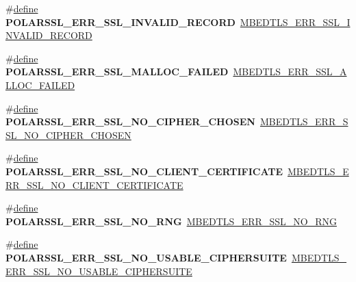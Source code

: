 \begin{DoxyCompactItemize}
\#\hyperlink{structdefine}{define} {\bfseries P\+O\+L\+A\+R\+S\+S\+L\+\_\+\+E\+R\+R\+\_\+\+S\+S\+L\+\_\+\+I\+N\+V\+A\+L\+I\+D\+\_\+\+R\+E\+C\+O\+RD}~\hyperlink{ssl_8h_aad21f6b8a740ef21dd162d91b809e3a4}{M\+B\+E\+D\+T\+L\+S\+\_\+\+E\+R\+R\+\_\+\+S\+S\+L\+\_\+\+I\+N\+V\+A\+L\+I\+D\+\_\+\+R\+E\+C\+O\+RD}
\item 
\mbox{\label{compat-1_83_8h_af35f4f9525fe3e98f989d2952fff254f}} 
\#\hyperlink{structdefine}{define} {\bfseries P\+O\+L\+A\+R\+S\+S\+L\+\_\+\+E\+R\+R\+\_\+\+S\+S\+L\+\_\+\+M\+A\+L\+L\+O\+C\+\_\+\+F\+A\+I\+L\+ED}~\hyperlink{ssl_8h_a701ee611f7a16a261b306466c8602177}{M\+B\+E\+D\+T\+L\+S\+\_\+\+E\+R\+R\+\_\+\+S\+S\+L\+\_\+\+A\+L\+L\+O\+C\+\_\+\+F\+A\+I\+L\+ED}
\item 
\mbox{\label{compat-1_83_8h_a95498cade77d8c7db264bf799b2753f5}} 
\#\hyperlink{structdefine}{define} {\bfseries P\+O\+L\+A\+R\+S\+S\+L\+\_\+\+E\+R\+R\+\_\+\+S\+S\+L\+\_\+\+N\+O\+\_\+\+C\+I\+P\+H\+E\+R\+\_\+\+C\+H\+O\+S\+EN}~\hyperlink{ssl_8h_a55ed67b6e414f9b381ff536d9ea6b9c0}{M\+B\+E\+D\+T\+L\+S\+\_\+\+E\+R\+R\+\_\+\+S\+S\+L\+\_\+\+N\+O\+\_\+\+C\+I\+P\+H\+E\+R\+\_\+\+C\+H\+O\+S\+EN}
\item 
\mbox{\label{compat-1_83_8h_aeb836450c3b6ffa966cf6cf74ffe927f}} 
\#\hyperlink{structdefine}{define} {\bfseries P\+O\+L\+A\+R\+S\+S\+L\+\_\+\+E\+R\+R\+\_\+\+S\+S\+L\+\_\+\+N\+O\+\_\+\+C\+L\+I\+E\+N\+T\+\_\+\+C\+E\+R\+T\+I\+F\+I\+C\+A\+TE}~\hyperlink{ssl_8h_aaa160d753b94b4ecf6e22a1415450e8f}{M\+B\+E\+D\+T\+L\+S\+\_\+\+E\+R\+R\+\_\+\+S\+S\+L\+\_\+\+N\+O\+\_\+\+C\+L\+I\+E\+N\+T\+\_\+\+C\+E\+R\+T\+I\+F\+I\+C\+A\+TE}
\item 
\mbox{\label{compat-1_83_8h_a19cbe729aeb55df7d04669cb98a38fe0}} 
\#\hyperlink{structdefine}{define} {\bfseries P\+O\+L\+A\+R\+S\+S\+L\+\_\+\+E\+R\+R\+\_\+\+S\+S\+L\+\_\+\+N\+O\+\_\+\+R\+NG}~\hyperlink{ssl_8h_aebfdb35dab3c9928c1db296b7b7140ab}{M\+B\+E\+D\+T\+L\+S\+\_\+\+E\+R\+R\+\_\+\+S\+S\+L\+\_\+\+N\+O\+\_\+\+R\+NG}
\item 
\mbox{\label{compat-1_83_8h_a7ca4fcdd5ec6418f0af9b8d67b12f847}} 
\#\hyperlink{structdefine}{define} {\bfseries P\+O\+L\+A\+R\+S\+S\+L\+\_\+\+E\+R\+R\+\_\+\+S\+S\+L\+\_\+\+N\+O\+\_\+\+U\+S\+A\+B\+L\+E\+\_\+\+C\+I\+P\+H\+E\+R\+S\+U\+I\+TE}~\hyperlink{ssl_8h_a50fc11595bf8ff0c2a39afe627623aae}{M\+B\+E\+D\+T\+L\+S\+\_\+\+E\+R\+R\+\_\+\+S\+S\+L\+\_\+\+N\+O\+\_\+\+U\+S\+A\+B\+L\+E\+\_\+\+C\+I\+P\+H\+E\+R\+S\+U\+I\+TE}

\end{DoxyCompactItemize}
